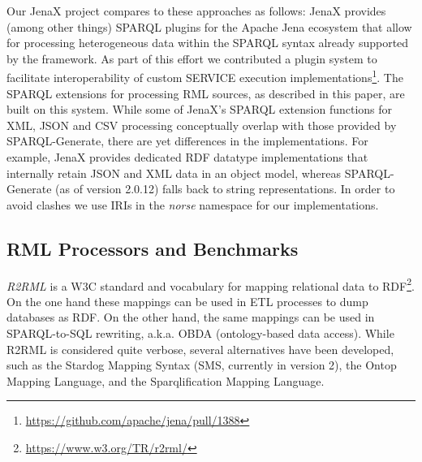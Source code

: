 Our JenaX project compares to these approaches as follows: JenaX provides (among other things) SPARQL plugins for the Apache Jena ecosystem that allow for processing heterogeneous data within the SPARQL syntax already supported by the framework.
As part of this effort we contributed a plugin system to facilitate interoperability of custom SERVICE execution implementations\footnote{\url{https://github.com/apache/jena/pull/1388}}.
The SPARQL extensions for processing RML sources, as described in this paper, are built on this system.
While some of JenaX's SPARQL extension functions for XML, JSON and CSV processing conceptually overlap with those provided by SPARQL-Generate, there are yet differences in the implementations. For example, JenaX provides dedicated RDF datatype implementations that internally retain JSON and XML data in an object model, whereas SPARQL-Generate (as of version 2.0.12) falls back to string representations.
In order to avoid clashes we use IRIs in the \emph{norse} namespace for our implementations.



\subsection{RML Processors and Benchmarks}
\emph{R2RML} is a W3C standard and vocabulary for mapping relational data to RDF\footnote{\url{https://www.w3.org/TR/r2rml/}}.
On the one hand these mappings can be used in ETL processes to dump databases as RDF. On the other hand, the same mappings can be used in SPARQL-to-SQL rewriting, a.k.a. OBDA (ontology-based data access). While R2RML is considered quite verbose, several alternatives have been developed, such as the Stardog Mapping Syntax (SMS, currently in version 2), the Ontop Mapping Language\cite{calvanese2017ontop}, and the Sparqlification Mapping Language\cite{stadler2015simplified}.


